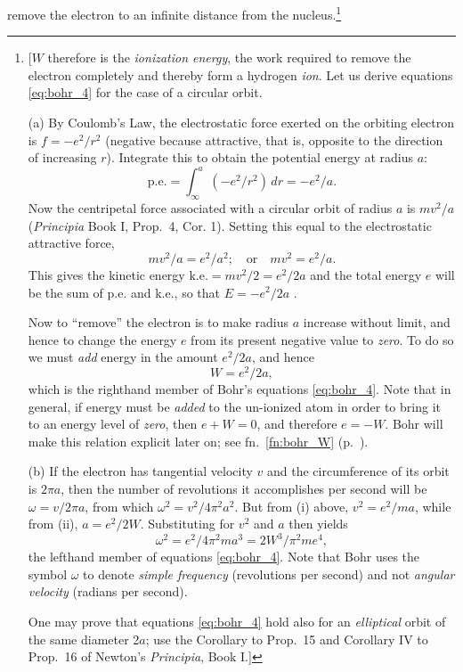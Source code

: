 remove the electron to an infinite distance from the nucleus.\footnote{{[}$W$
  therefore is the \emph{ionization energy}, the work required to remove
  the electron completely and thereby form a hydrogen \emph{ion}. Let us
  derive equations \eqref{eq:bohr_4} for the case of a circular orbit.

  (a) By Coulomb's Law, the electrostatic force exerted on the orbiting
  electron is $f = -e^2/r^2$ (negative because attractive, that
  is, opposite to the direction of increasing $r$). Integrate this
  to obtain the potential energy at radius $a$:
  \begin{equation*}
  \text{p.e.}  = \int_{\infty}^{a} \left(-e^2/r^2\right)\,dr = - e^2/a .
  \end{equation*}
  Now the centripetal force associated with a circular orbit of radius
  $a$ is $mv^2/a$ (\emph{Principia} Book I, Prop.\ 4,
  Cor. 1). Setting this equal to the electrostatic attractive force,
  \begin{equation*}\tag{i}
  mv^2/a = e^2/a^2 ; \quad\text{or}\quad mv^2 = e^2/a .
  \end{equation*}
  This gives the kinetic energy $\text{k.e.} = mv^2/2 = e^2/2a$
  and the total energy $e$ will be the sum of p.e. and k.e., so
  that $E = -e^2/2a$ .

  Now to ``remove'' the electron is to make radius $a$ increase
  without limit, and hence to change the energy $e$ from its
  present negative value to \emph{zero}. To do so we must \emph{add}
  energy in the amount $e^2/2a$, and hence
  \begin{equation*}\tag{ii}
  W = e^2/2a ,
  \end{equation*}
  which is the righthand member of Bohr's equations \eqref{eq:bohr_4}. Note that in
  general, if energy must be \emph{added} to the un-ionized atom in
  order to bring it to an energy level of \emph{zero}, then
  $e + W = 0$, and therefore $e = -W$. Bohr will
  make this relation explicit later on;\label{fn:bohr_W*} see fn.~\ref{fn:bohr_W} (p.~\pageref{fn:bohr_W}).

  (b) If the electron has tangential velocity $v$ and the
  circumference of its orbit is $2\pi a$, then the number of
  revolutions it accomplishes per second will be $\omega = v/2\pi a$, from which
   $\omega^2 = v^2/4\pi^2a^2.$ But from (i) above, $v^2 = e^2/ma$,
  while from (ii), $a = e^2/2W$.  
  Substituting for $v^2$ and $a$ then yields
  \begin{equation*}
  \omega^2 = e^2/4\pi^2ma^3 = 2W^3/\pi^2me^4 ,
  \end{equation*}
  the lefthand member of equations \eqref{eq:bohr_4}. Note that Bohr uses the symbol
  $\omega$ to denote \emph{simple frequency} (revolutions per second)
  and not \emph{angular velocity} (radians per second).

  One may prove that equations \eqref{eq:bohr_4} hold also for an \emph{elliptical}
  orbit of the same diameter 2$a$; use the Corollary to Prop.\ 15
  and Corollary IV to Prop.\ 16 of Newton's \emph{Principia}, Book I.{]}}


